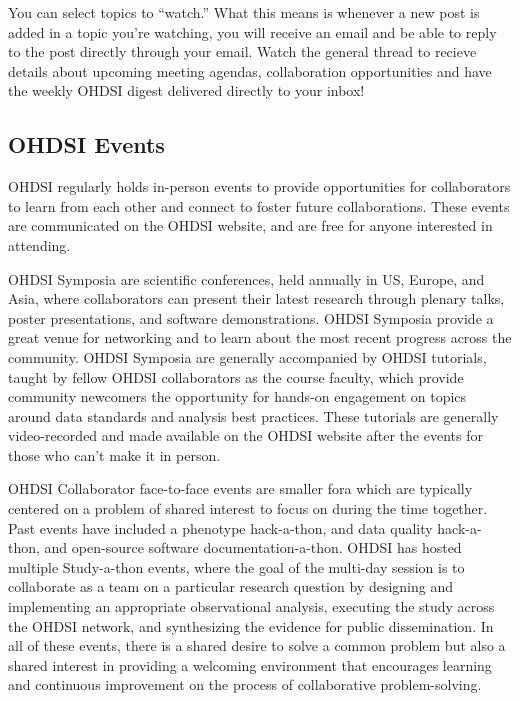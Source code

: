 \documentclass[11pt]{book}
\theoremstyle{definition}
\theoremstyle{definition}
\theoremstyle{definition}
\theoremstyle{remark}
\let\BeginKnitrBlock\begin \let\EndKnitrBlock\end
\begin{document}
\BeginKnitrBlock{rmdimportant}
You can select topics to ``watch.'' What this means is whenever a new
post is added in a topic you're watching, you will receive an email and
be able to reply to the post directly through your email. Watch the
general thread to recieve details about upcoming meeting agendas,
collaboration opportunities and have the weekly OHDSI digest delivered
directly to your inbox!
\EndKnitrBlock{rmdimportant}

\subsection{OHDSI Events}\label{ohdsi-events}

OHDSI regularly holds in-person events to provide opportunities for
collaborators to learn from each other and connect to foster future
collaborations. These events are communicated on the OHDSI website, and
are free for anyone interested in attending.

OHDSI Symposia are scientific conferences, held annually in US, Europe,
and Asia, where collaborators can present their latest research through
plenary talks, poster presentations, and software demonstrations. OHDSI
Symposia provide a great venue for networking and to learn about the
most recent progress across the community. OHDSI Symposia are generally
accompanied by OHDSI tutorials, taught by fellow OHDSI collaborators as
the course faculty, which provide community newcomers the opportunity
for hands-on engagement on topics around data standards and analysis
best practices. These tutorials are generally video-recorded and made
available on the OHDSI website after the events for those who can't make
it in person.

OHDSI Collaborator face-to-face events are smaller fora which are
typically centered on a problem of shared interest to focus on during
the time together. Past events have included a phenotype hack-a-thon,
and data quality hack-a-thon, and open-source software
documentation-a-thon. OHDSI has hosted multiple Study-a-thon events,
where the goal of the multi-day session is to collaborate as a team on a
particular research question by designing and implementing an
appropriate observational analysis, executing the study across the OHDSI
network, and synthesizing the evidence for public dissemination. In all
of these events, there is a shared desire to solve a common problem but
also a shared interest in providing a welcoming environment that
encourages learning and continuous improvement on the process of
collaborative problem-solving.
\end{document}
